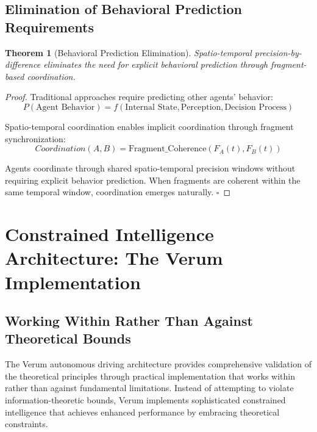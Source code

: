 \documentclass[12pt,a4paper]{article}
\newtheorem{theorem}{Theorem}[section]
\begin{document}
\subsection{Elimination of Behavioral Prediction Requirements}

\begin{theorem}[Behavioral Prediction Elimination]
Spatio-temporal precision-by-difference eliminates the need for explicit behavioral prediction through fragment-based coordination.
\end{theorem}

\begin{proof}
Traditional approaches require predicting other agents' behavior:
\begin{equation}
P(\text{Agent Behavior}) = f(\text{Internal State}, \text{Perception}, \text{Decision Process})
\end{equation}

Spatio-temporal coordination enables implicit coordination through fragment synchronization:
\begin{equation}
Coordination(A,B) = \text{Fragment\_Coherence}(F_A(t), F_B(t))
\end{equation}

Agents coordinate through shared spatio-temporal precision windows without requiring explicit behavior prediction. When fragments are coherent within the same temporal window, coordination emerges naturally. $\square$
\end{proof}

\section{Constrained Intelligence Architecture: The Verum Implementation}

\subsection{Working Within Rather Than Against Theoretical Bounds}

The Verum autonomous driving architecture provides comprehensive validation of the theoretical principles through practical implementation that works within rather than against fundamental limitations. Instead of attempting to violate information-theoretic bounds, Verum implements sophisticated constrained intelligence that achieves enhanced performance by embracing theoretical constraints.
\end{document}
